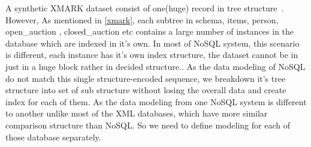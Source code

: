 A synthetic XMARK dataset consist of one(huge) record in tree structure~\cite{xmark/VIST}. However, As mentioned in \ref{xmark}, each subtree in schema, items, person, open\_auction , closed\_auction etc contains a large number of instances in the database which are indexed in it's own. In most of NoSQL system, this scenario is different, each instance has it's own index structure, the dataset cannot be in just in a huge block rather in decided structure.. As the data modeling of NoSQL do not match this single structure-encoded sequence, we breakdown it's tree structure into set of sub structure without losing the overall data and create index for each of them. As the data modeling from one NoSQL system is different to another unlike most of the XML databases, which have more similar comparison structure than NoSQL. So we need to define modeling for each of those database separately. 